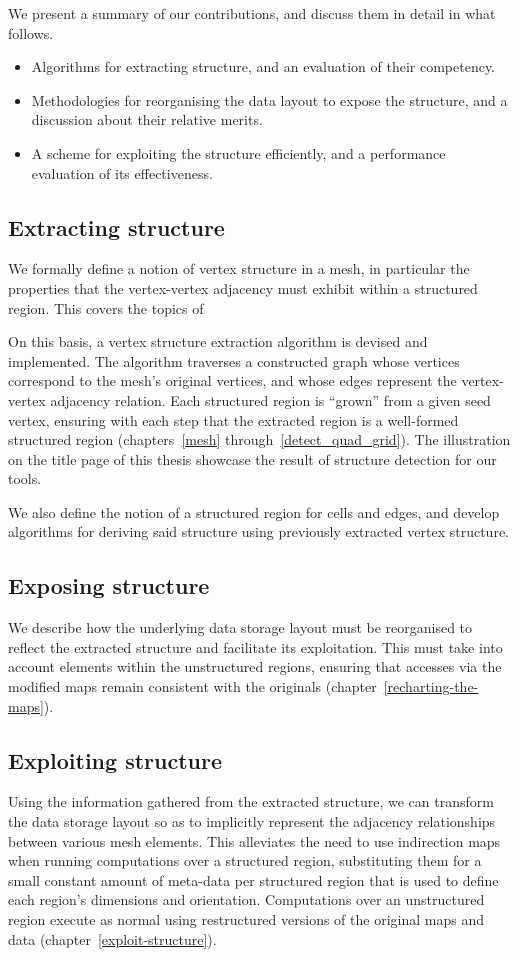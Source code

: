 We present a summary of our contributions, and discuss them in detail in what follows.

\begin{itemize}
\item Algorithms for extracting structure, and an evaluation of their competency.
\item Methodologies for reorganising the data layout to expose the structure, and a discussion about their relative merits.
\item A scheme for exploiting the structure efficiently, and a performance evaluation of its effectiveness.
\end{itemize}


\subsection{Extracting structure}
We formally define a notion of vertex structure in a mesh, in particular the properties that the vertex-vertex adjacency must exhibit within a structured region. This covers the topics of


On this basis, a vertex structure extraction algorithm is devised and implemented. The algorithm traverses a constructed graph whose vertices correspond to the mesh's original vertices, and whose edges represent the vertex-vertex adjacency relation. Each structured region is ``grown'' from a given seed vertex, ensuring with each step that the extracted region is a well-formed structured region (chapters~\ref{mesh} through~\ref{detect_quad_grid}). The illustration on the title page of this thesis showcase the result of structure detection for our tools.

We also define the notion of a structured region for cells and edges, and develop algorithms for deriving said structure using previously extracted vertex structure.

\subsection{Exposing structure}
We describe how the underlying data storage layout must be reorganised to reflect the extracted structure and facilitate its exploitation. This must take into account elements within the unstructured regions, ensuring that accesses via the modified maps remain consistent with the originals (chapter~\ref{recharting-the-maps}).

\subsection{Exploiting structure}
Using the information gathered from the extracted structure, we can transform the data storage layout so as to implicitly represent the adjacency relationships between various mesh elements. This alleviates the need to use indirection maps when running computations over a structured region, substituting them for a small constant amount of meta-data per structured region that is used to define each region's dimensions and orientation. Computations over an unstructured region execute as normal using restructured versions of the original maps and data (chapter~\ref{exploit-structure}).

